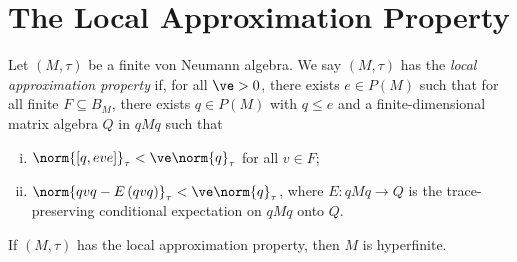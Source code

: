 \documentclass[10pt]{mypackage}
\begin{document}
\section{The Local Approximation Property}%
\begin{definition}
  Let $\left( M,\tau \right)$ be a finite von Neumann algebra. We say $\left( M,\tau \right)$ has the \textit{local approximation property} if, for all $\ve > 0$, there exists $e\in P(M)$ such that for all finite $F\subseteq B_M$, there exists $q\in P(M)$ with $q\leq e$ and a finite-dimensional matrix algebra $Q$ in $qMq$ such that
  \begin{enumerate}[(i)]
    \item $\norm{\left[ q,eve \right]}_{\tau} < \ve\norm{q}_{\tau}$ for all $v\in F$;
    \item $\norm{qvq - E\left( qvq \right)}_{\tau} < \ve\norm{q}_{\tau}$, where $E\colon qMq\rightarrow Q$ is the trace-preserving conditional expectation on $qMq$ onto $Q$.
  \end{enumerate}
\end{definition}
\begin{theorem}
  If $\left( M,\tau \right)$ has the local approximation property, then $M$ is hyperfinite.
\end{theorem}
\end{document}
